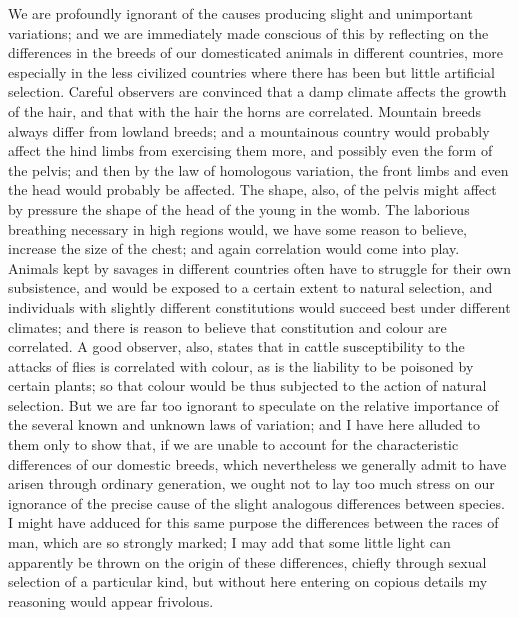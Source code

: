 \indent We are profoundly ignorant of the causes producing slight and unimportant variations; and we are immediately made conscious of this by reflecting on the differences in the breeds of our domesticated animals in different countries, more especially in the less civilized countries where there has been but little artificial selection. Careful observers are convinced that a damp climate affects the growth of the hair, and that with the hair the horns are correlated. Mountain breeds always differ from lowland breeds; and a mountainous country would probably affect the hind limbs from exercising them more, and possibly even the form of the pelvis; and then by the law of homologous variation, the front limbs and even the head would probably be affected. The shape, also, of the pelvis might affect by pressure the shape of the head of the young in the womb. The laborious breathing necessary in high regions would, we have some reason to believe, increase the size of the chest; and again correlation would come into play. Animals kept by savages in different countries often have to struggle for their own subsistence, and would be exposed to a certain extent to natural selection, and individuals with slightly different constitutions would succeed best under different climates; and there is reason to believe that constitution and colour are correlated. A good observer, also, states that in cattle susceptibility to the attacks of flies is correlated with colour, as is the liability to be poisoned by certain plants; so that colour would be thus subjected to the action of natural selection. But we are far too ignorant to speculate on the relative importance of the several known and unknown laws of variation; and I have here alluded to them only to show that, if we are unable to account for the characteristic differences of our domestic breeds, which nevertheless we generally admit to have arisen through ordinary generation, we ought not to lay too much stress on our ignorance of the precise cause of the slight analogous differences between species. I might have adduced for this same purpose the differences between the races of man, which are so strongly marked; I may add that some little light can apparently be thrown on the origin of these differences, chiefly through sexual selection of a particular kind, but without here entering on copious details my reasoning would appear frivolous.\\
